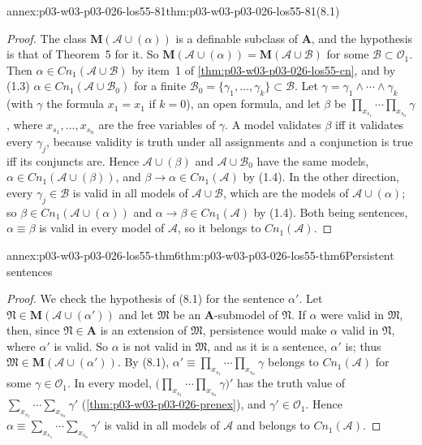 \begin{annexitem}{annex:p03-w03-p03-026-los55-81}{thm:p03-w03-p03-026-los55-81}{(8.1)}
\begin{proof}
The class \(\mathbf M(\mathcal A\cup(\alpha))\) is a definable subclass of
\(\mathbf A\), and the hypothesis is that of Theorem~5 for it.  So
\(\mathbf M(\mathcal A\cup(\alpha))=\mathbf M(\mathcal A\cup\mathcal B)\) for
some \(\mathcal B\subset\mathcal O_1\).  Then
\(\alpha\in\mathit{Cn}_1(\mathcal A\cup\mathcal B)\) by item~1 of
\cref{thm:p03-w03-p03-026-los55-cn}, and by (1.3)
\(\alpha\in\mathit{Cn}_1(\mathcal A\cup\mathcal B_0)\) for a finite
\(\mathcal B_0=\{\gamma_1,\ldots,\gamma_k\}\subset\mathcal B\).  Let
\(\gamma=\gamma_1\land\cdots\land\gamma_k\) (with \(\gamma\) the formula
\(x_1=x_1\) if \(k=0\)), an open formula, and let \(\beta\) be
\(\prod_{x_{s_1}}\cdots\prod_{x_{s_n}}\gamma\), where
\(x_{s_1},\ldots,x_{s_n}\) are the free variables of \(\gamma\).  A model
validates \(\beta\) iff it validates every \(\gamma_j\), because validity is
truth under all assignments and a conjunction is true iff its conjuncts are.
Hence \(\mathcal A\cup(\beta)\) and \(\mathcal A\cup\mathcal B_0\) have the same
models, \(\alpha\in\mathit{Cn}_1(\mathcal A\cup(\beta))\), and
\(\beta\to\alpha\in\mathit{Cn}_1(\mathcal A)\) by (1.4).  In the other
direction, every \(\gamma_j\in\mathcal B\) is valid in all models of
\(\mathcal A\cup\mathcal B\), which are the models of
\(\mathcal A\cup(\alpha)\); so \(\beta\in\mathit{Cn}_1(\mathcal A\cup(\alpha))\)
and \(\alpha\to\beta\in\mathit{Cn}_1(\mathcal A)\) by (1.4).  Both being
sentences, \(\alpha\equiv\beta\) is valid in every model of \(\mathcal A\), so
it belongs to \(\mathit{Cn}_1(\mathcal A)\).
\end{proof}
\end{annexitem}

\begin{annexitem}{annex:p03-w03-p03-026-los55-thm6}{thm:p03-w03-p03-026-los55-thm6}{Persistent sentences}
\begin{proof}
We check the hypothesis of (8.1) for the sentence \(\alpha'\).  Let
\(\mathfrak N\in\mathbf M(\mathcal A\cup(\alpha'))\) and let \(\mathfrak M\) be
an \(\mathbf A\)-submodel of \(\mathfrak N\).  If \(\alpha\) were valid in
\(\mathfrak M\), then, since \(\mathfrak N\in\mathbf A\) is an extension of
\(\mathfrak M\), persistence would make \(\alpha\) valid in \(\mathfrak N\),
where \(\alpha'\) is valid.  So \(\alpha\) is not valid in \(\mathfrak M\), and
as it is a sentence, \(\alpha'\) is; thus
\(\mathfrak M\in\mathbf M(\mathcal A\cup(\alpha'))\).  By (8.1),
\(\alpha'\equiv\prod_{x_{s_1}}\cdots\prod_{x_{s_n}}\gamma\) belongs to
\(\mathit{Cn}_1(\mathcal A)\) for some \(\gamma\in\mathcal O_1\).  In every
model, \(\bigl(\prod_{x_{s_1}}\cdots\prod_{x_{s_n}}\gamma\bigr)'\) has the
truth value of \(\sum_{x_{s_1}}\cdots\sum_{x_{s_n}}\gamma'\)
(\cref{thm:p03-w03-p03-026-prenex}), and \(\gamma'\in\mathcal O_1\).  Hence
\(\alpha\equiv\sum_{x_{s_1}}\cdots\sum_{x_{s_n}}\gamma'\) is valid in all
models of \(\mathcal A\) and belongs to \(\mathit{Cn}_1(\mathcal A)\).
\end{proof}
\end{annexitem}

